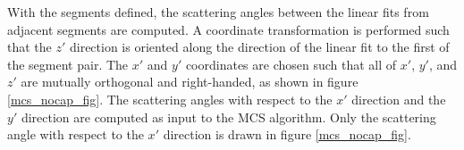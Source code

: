 \documentclass[a4paper,11pt]{article}
\begin{document}
With the segments defined, the scattering angles between the linear fits from adjacent segments are computed. A coordinate transformation is performed such that the $z'$ direction is oriented along the direction of the linear fit to the first of the segment pair. The $x'$ and $y'$ coordinates are chosen such that all of $x'$, $y'$, and $z'$ are mutually orthogonal and right-handed, as shown in figure \ref{mcs_nocap_fig}. The scattering angles with respect to the $x'$ direction and the $y'$ direction are computed as input to the MCS algorithm. Only the scattering angle with respect to the $x'$ direction is drawn in figure \ref{mcs_nocap_fig}.



\end{document}
